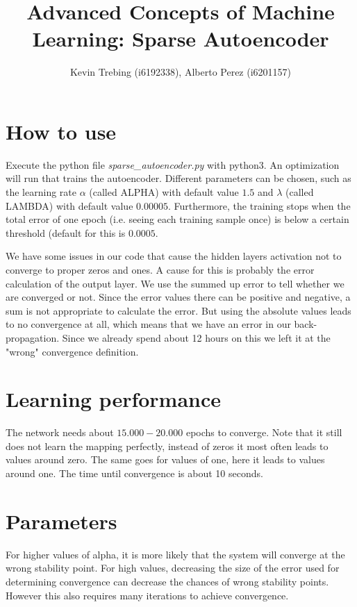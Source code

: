 \documentclass[a4paper]{article}
\title{Advanced Concepts of Machine Learning: Sparse Autoencoder}
\author{Kevin Trebing (i6192338), Alberto Perez (i6201157)}
\begin{document}
\maketitle

\section{How to use}
Execute the python file \textit{sparse\_autoencoder.py} with python3. An optimization will run that trains the autoencoder. Different parameters can be chosen, such as the learning rate $\alpha$ (called ALPHA) with default value $1.5$ and $\lambda$ (called LAMBDA) with default value $0.00005$. Furthermore, the training stops when the total error of one epoch (i.e. seeing each training sample once) is below a certain threshold (default for this is $0.0005$.

We have some issues in our code that cause the hidden layers activation not to converge to proper zeros and ones. A cause for this is probably the error calculation of the output layer. We use the summed up error to tell whether we are converged or not. Since the error values there can be positive and negative, a sum is not appropriate to calculate the error. But using the absolute values leads to no convergence at all, which means that we have an error in our back-propagation. Since we already spend about 12 hours on this we left it at the "wrong" convergence definition.


\section{Learning performance}
The network needs about $15.000-20.000$ epochs to converge. Note that it still does not learn the mapping perfectly, instead of zeros it most often leads to values around zero. The same goes for values of one, here it leads to values around one. The time until convergence is about 10 seconds.

\section{Parameters}

For higher values of alpha, it is more likely that the system will converge at the wrong stability point. For high values, decreasing the size of the error used for determining convergence can decrease the chances of wrong stability points. However this also requires many iterations to achieve convergence.
\end{document}
